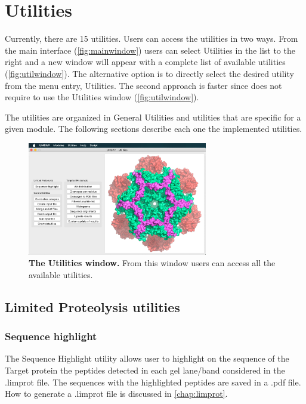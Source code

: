 \chapter{Utilities}
\label{chap:util}

Currently, there are \num{15} utilities. Users can access the utilities in two ways. From the main interface (\autoref{fig:mainwindow}) users can select Utilities in the list to the right and a new window will appear with a complete list of available utilities (\autoref{fig:utilwindow}). The alternative option is to directly select the desired utility from the menu entry, Utilities. The second approach is faster since does not require to use the Utilities window (\autoref{fig:utilwindow}).

The utilities are organized in General Utilities and utilities that are specific for a given module. The following sections describe each one the implemented utilities.

\begin{figure}[h]
	\centering
	\includegraphics[width=0.7\textwidth]{./IMAGES/UTIL-WINDOW/util.jpg}	    
	\caption[The Utilities window]{\textbf{The Utilities window.} From this window users can access all the available utilities.} 
	\label{fig:utilwindow}
	\vspace{-5pt} 	
\end{figure} 

\section{Limited Proteolysis utilities}

\subsection{Sequence highlight}
\label{subsec:seqhigh}
The Sequence Highlight utility allows user to highlight on the sequence of the Target protein the peptides detected in each gel lane/band considered in the .limprot file. The sequences with the highlighted peptides are saved in a .pdf file. How to generate a .limprot file is discussed in \autoref{chap:limprot}.


